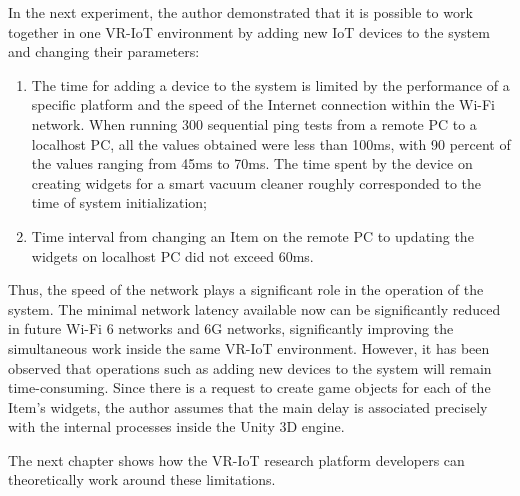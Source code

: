 In the next experiment, the author demonstrated that it is possible to work together in one VR-IoT environment by adding new IoT devices to the system and changing their parameters:
\begin{enumerate}
    \item The time for adding a device to the system is limited by the performance of a specific platform and the speed of the Internet connection within the Wi-Fi network. When running 300 sequential ping tests from a remote PC to a localhost PC, all the values ​​obtained were less than 100ms, with 90 percent of the values ranging from 45ms to 70ms. The time spent by the device on creating widgets for a smart vacuum cleaner roughly corresponded to the time of system initialization;
    \item Time interval from changing an Item on the remote PC to updating the widgets on localhost PC did not exceed 60ms.
\end{enumerate}

Thus, the speed of the network plays a significant role in the operation of the system. The minimal network latency available now can be significantly reduced in future Wi-Fi 6 networks and 6G networks, significantly improving the simultaneous work inside the same VR-IoT environment. However, it has been observed that operations such as adding new devices to the system will remain time-consuming. Since there is a request to create game objects for each of the Item's widgets, the author assumes that the main delay is associated precisely with the internal processes inside the Unity 3D engine.

The next chapter shows how the VR-IoT research platform developers can theoretically work around these limitations.